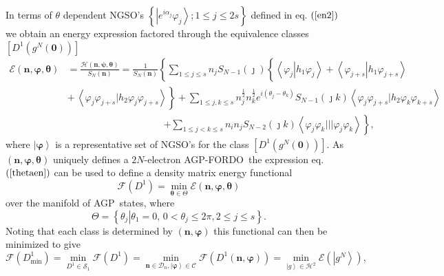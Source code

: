 \documentclass[aps,preprint]{revtex4}%
\begin{document}
In terms of $\theta$ dependent NGSO's $\left\{  \left\vert e^{i\alpha_{j}%
}\varphi_{j}\right\rangle ;1\leq j\leq2s\right\}  $ defined in eq. $\left(
\ref{en2}\right)  $ we obtain an energy expression factored through the
equivalence classes $\left[  D^{1}\left(  g^{N}\left(  \bm{0}\right)  \right)
\right]  $
\begin{align}
\mathcal{E}\left(  \bm{n},\bm{\varphi},\bm{\theta}\right)   &  =\frac
{\mathcal{H}\left(  \bm{n},\bm{\psi},\bm{\theta}\right)  }{S_{N}\left(
\bm{n}\right)  }=\frac{1}{S_{N}\left(  \bm{n}\right)  }\left\{  \sum_{1\leq
j\leq s}n_{j}S_{N-1}\left(  \jmath\right)  \left\{  \overset{}{\left\langle
\varphi_{j}\left\vert h_{1}\varphi_{j}\right.  \right\rangle +\left\langle
\varphi_{j+s}\left\vert h_{1}\varphi_{j+s}\right.  \right\rangle }\right.
\right. \nonumber\\
&  \left.  +\overset{}{\,\left\langle \varphi_{j}\varphi_{j+s}|h_{2}%
\varphi_{j}\varphi_{j+s}\right\rangle }\right\}  +\sum_{1\leq j,k\leq s}%
n_{j}^{\frac{1}{2}}n_{k}^{\frac{1}{2}}e^{i\left(  \theta_{j}-\theta
_{k}\right)  }S_{N-1}\left(  \jmath k\right)  \left\langle \varphi_{j}%
\varphi_{j+s}|h_{2}\varphi_{k}\varphi_{k+s}\right\rangle \nonumber\\
&  \qquad\qquad\qquad\qquad\qquad\left.  +\sum_{1\leq j<k\leq s}n_{i}%
n_{j}S_{N-2}\left(  \jmath k\right)  \left\langle \varphi_{j}\varphi
_{k}|||\varphi_{j}\varphi_{k}\right\rangle \right\}  , \label{thetaen}%
\end{align}
where $\left\vert \bm{\varphi}\right\rangle $ is a representative set of
NGSO's for the class $\left[  D^{1}\left(  g^{N}\left(  \bm{0}\right)
\right)  \right]  $. As $\left(  \bm{n},\bm{\varphi,\theta}\right)  $ uniquely
defines a $2N$-electron AGP-FORDO\ the expression eq. $\left(  \ref{thetaen}%
\right)  $ can be used to define a density matrix energy functional
\begin{equation}
\mathcal{F}\left(  D^{1}\right)  =\min_{\bm{\theta\in}\Theta}\mathcal{E}%
\left(  \bm{n},\bm{\varphi},\bm{\theta}\right)
\end{equation}
over the manifold of AGP\ states, where
\begin{equation}
\Theta=\left\{  \left.  \theta_{j}\right\vert \theta_{1}=0,\,0<\theta_{j}%
\leq2\pi,2\leq j\leq s\right\}  .
\end{equation}
Noting that each class is determined by $\left(  \bm{n},\bm{\varphi
}\right)  $ this functional can then be minimized to give
\begin{equation}
\mathcal{F}\left(  D_{\min}^{1}\right)  =\min_{D^{1}\in\mathcal{S}_{1}%
}\mathcal{F}\left(  D^{1}\right)  =\min_{\bm{n\in}\mathcal{D}_{n},\left\vert
\bm{\varphi}\right\rangle \in\mathcal{C}}\mathcal{F}\left(  D^{1}\left(
\bm{n},\bm{\varphi}\right)  \right)  =\min_{\left\vert g\right\rangle
\in\mathcal{H}^{2}}\mathcal{E}\left(  \left\vert g^{N}\right\rangle \right)  ,
\label{MinDMF}%
\end{equation}
\end{document}
